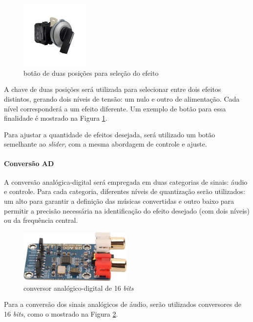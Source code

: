\begin{figure}[h]
    \centering
    \includegraphics[width=0.3\textwidth]{figuras/fig62.png}
    \caption{botão de duas posições para seleção do efeito \cite{evea}}
    \label{fig62}
\end{figure}

A chave de duas posições será utilizada para selecionar entre dois efeitos distintos, gerando dois níveis de tensão: um nulo e outro de alimentação. Cada nível corresponderá a um efeito diferente. Um exemplo de botão para essa finalidade é mostrado na Figura \ref{fig62}.

Para ajustar a quantidade de efeitos desejada, será utilizado um botão semelhante ao \textit{slider}, com a mesma abordagem de controle e ajuste.

\paragraph{Conversão AD}
A conversão analógica-digital será empregada em duas categorias de sinais: áudio e controle. Para cada categoria, diferentes níveis de quantização serão utilizados: um alto para garantir a definição das músicas convertidas e outro baixo para permitir a precisão necessária na identificação do efeito desejado (com dois níveis) ou da frequência central.
 
\begin{figure}[h]
    \centering
    \includegraphics[width=0.5\textwidth]{figuras/fig63.jpg}
    \caption{conversor analógico-digital de 16 \textit{bits} \cite{walmartRobotHuman}}
    \label{fig63}
\end{figure}

Para a conversão dos sinais analógicos de áudio, serão utilizados conversores de 16 \textit{bits}, como o mostrado na Figura \ref{fig63}. 

